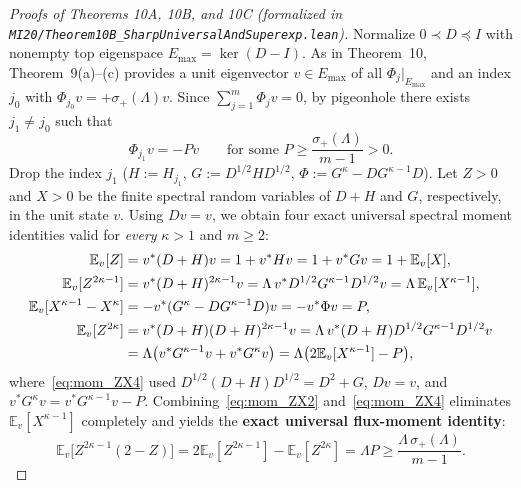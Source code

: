\documentclass[10pt,letterpaper]{article}
\begin{document}
\begin{proof}[Proofs of Theorems 10A, 10B, and 10C (formalized in \texttt{MI20/Theorem10B\_\allowbreak SharpUniversalAndSuperexp.lean})]
Normalize $0 \prec D \preceq I$ with nonempty top eigenspace $E_{\max} = \ker(D - I)$. As in Theorem~10, Theorem~9(a)--(c) provides a unit eigenvector $v \in E_{\max}$ of all $\Phi_j|_{E_{\max}}$ and an index $j_0$ with $\Phi_{j_0} v = +\sigma_+(\Lambda) v$. Since $\sum_{j=1}^m \Phi_j v = 0$, by pigeonhole there exists $j_1 \neq j_0$ such that
\[
  \Phi_{j_1} v = -P v \qquad \text{for some } P \ge \frac{\sigma_+(\Lambda)}{m - 1} > 0.
\]
Drop the index $j_1$ ($H := H_{j_1}$, $G := D^{1/2} H D^{1/2}$, $\Phi := G^\kappa - D G^{\kappa-1} D$). Let $Z > 0$ and $X > 0$ be the finite spectral random variables of $D + H$ and $G$, respectively, in the unit state $v$. Using $Dv = v$, we obtain four exact universal spectral moment identities valid for \emph{every} $\kappa > 1$ and $m \ge 2$:
\begin{align}
  \mathbb{E}_v[Z] &= v^*(D + H)v = 1 + v^* H v = 1 + v^* G v = 1 + \mathbb{E}_v[X], \label{eq:mom_ZX1}\\
  \mathbb{E}_v[Z^{2\kappa - 1}] &= v^*(D + H)^{2\kappa - 1}v = \Lambda\, v^* D^{1/2} G^{\kappa - 1} D^{1/2} v = \Lambda\,\mathbb{E}_v[X^{\kappa - 1}], \label{eq:mom_ZX2}\\
  \mathbb{E}_v[X^{\kappa - 1} - X^\kappa] &= -v^*(G^\kappa - D G^{\kappa - 1} D)v = -v^*\Phi v = P, \label{eq:mom_ZX3}\\
  \mathbb{E}_v[Z^{2\kappa}] &= v^*(D + H)(D + H)^{2\kappa - 1}v = \Lambda\, v^*(D + H)D^{1/2} G^{\kappa - 1} D^{1/2} v \notag\\
  &= \Lambda\bigl(v^* G^{\kappa - 1} v + v^* G^\kappa v\bigr) = \Lambda\bigl(2\mathbb{E}_v[X^{\kappa - 1}] - P\bigr), \label{eq:mom_ZX4}
\end{align}
where~\eqref{eq:mom_ZX4} used $D^{1/2}(D+H)D^{1/2} = D^2 + G$, $Dv = v$, and $v^* G^\kappa v = v^* G^{\kappa-1} v - P$. Combining~\eqref{eq:mom_ZX2} and~\eqref{eq:mom_ZX4} eliminates $\mathbb{E}_v[X^{\kappa-1}]$ completely and yields the \textbf{exact universal flux-moment identity}:
\begin{equation}\label{eq:flux_Z_id}
  \mathbb{E}_v\bigl[Z^{2\kappa - 1}(2 - Z)\bigr] = 2\mathbb{E}_v[Z^{2\kappa - 1}] - \mathbb{E}_v[Z^{2\kappa}] = \Lambda P \ge \frac{\Lambda\,\sigma_+(\Lambda)}{m - 1}.
\end{equation}


\end{proof}
\end{document}
